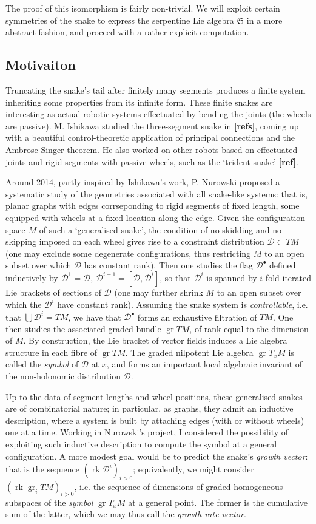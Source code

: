 \documentclass{article}
\def\fS{\mathfrak{S}}
\def\sD{\mathcal{D}}
\DeclareMathOperator{\gr}{\mathrm{gr}}
\DeclareMathOperator{\rk}{\mathrm{rk}}
\begin{document}
The proof of this isomorphism is fairly non-trivial. We will exploit certain symmetries
of the snake to express the serpentine Lie algebra $\fS$ in a more abstract fashion,
and proceed with a rather explicit computation. 

\subsection{Motivaiton}
Truncating the snake's tail after finitely many segments
produces a finite system inheriting some properties from 
its infinite form. 
These finite snakes are interesting as actual
robotic systems effectuated by bending the joints (the wheels are passive). 
M. Ishikawa studied the three-segment snake in \textbf{[refs]},
coming up with a beautiful control-theoretic application of
principal connections and the Ambrose-Singer theorem. He also worked on other robots based on
effectuated joints and rigid segments with passive wheels, such as
the `trident snake' \textbf{[ref]}.

Around 2014, partly inspired by Ishikawa's work, P. Nurowski proposed 
a systematic study of the geometries associated with all snake-like systems: 
that is, planar graphs with edges corrseponding to rigid segments of fixed
length, some equipped with wheels at a fixed location along the edge. 
Given the configuration space $M$ of such a `generalised snake', 
the condition of no skidding and no skipping imposed on each wheel
gives rise to a constraint distribution $\sD \subset TM$ (one may 
exclude some degenerate configurations, thus restricting $M$ to an 
open subset over which $\sD$ has constant rank). Then one studies
the flag $\sD^\bullet$ defined inductively by $\sD^1 = \sD$,
$\sD^{i+1}=[\sD,\sD^i]$, so that $\sD^{i}$
is spanned by $i$-fold iterated Lie brackets of sections of $\sD$
(one may further shrink $M$ to an open subset over which
the $\sD^i$ have constant rank). Assuming the snake system is \emph{controllable},
i.e. that $\bigcup \sD^i=TM$, we have that $\sD^\bullet$
forms an exhaustive filtration of $TM$. One then studies the associated graded
bundle $\gr TM$, of rank equal to the dimension of $M$. By construction, the Lie
bracket of vector fields induces a Lie algebra structure in each fibre of $\gr TM$.
The graded nilpotent Lie algebra $\gr T_x M$ is called the \emph{symbol} of $\sD$ at $x$, and forms
an important local algebraic invariant of the non-holonomic distribution $\sD$.

Up to the data of segment lengths and wheel positions, these generalised snakes
are of combinatorial nature; in particular, as graphs, they admit an inductive
description, where a system is built by attaching edges (with or without wheels)
one at a time. Working in Nurowski's project, I considered the possibility of exploiting
such inductive description to compute the symbol at a general configuration.
A more modest goal would be to predict the snake's \emph{growth vector}: that is
the sequence $(\rk\sD^i)_{i>0}$; equivalently, we might consider
$(\rk \gr_iTM)_{i>0}$, i.e. 
the sequence of dimensions
of graded homogeneous subspaces of the \emph{symbol} $\gr T_x M$ at a general point.
The former is the cumulative sum of the latter, which we may thus call the
\emph{growth rate vector}.
\end{document}
